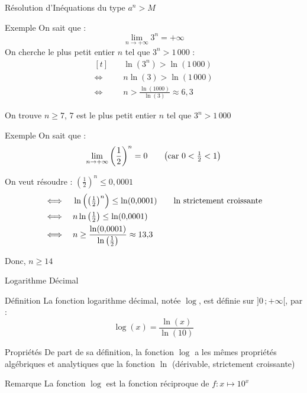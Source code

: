 \documentclass{cours}
\begin{document}
    \begin{Gpartie}{Résolution d'Inéquations du type $a^n>M$}
        \begin{Spartie}{Exemple}
            On sait que : \[\lim_{n\to+\infty}3^n=+\infty\]
            On cherche le plus petit entier $n$ tel que $3^n>1\,000$ :
            \[\begin{aligned}[t]
                &\quad\ln(3^n)>\ln(1\,000) \\
                \iff&\quad n\ln(3)>\ln(1\,000) \\
                \iff&\quad n>\frac{\ln(1000)}{\ln(3)}\approx 6{,}3
            \end{aligned}\]

            On trouve $n\geq 7$, $7$ est le plus petit entier $n$ tel que $3^n>1\,000$
        \end{Spartie}
        \begin{Spartie}{Exemple}
            On sait que : \[\lim_{n\to+\infty}\left(\frac{1}{2}\right)^n=0\text{\qquad \big(car $0<\tfrac{1}{2}<1$\big)}\]
            
            On veut résoudre : $\left(\frac{1}{2}\right)^n\leq 0{,}0001$
            \[\begin{aligned}[t]
                \iff&\quad\ln\Big(\big(\tfrac{1}{2}\big)^n\Big)\leq\ln(0{,}0001)\text{\qquad $\ln$ strictement croissante} \\
                \iff&\quad n\ln\big(\tfrac{1}{2}\big)\leq\ln(0{,}0001) \\
                \iff&\quad n\geq\frac{\ln(0{,}0001)}{\ln\left(\frac{1}{2}\right)}\approx13{,}3
            \end{aligned}\]

            Donc, $n\geq 14$
        \end{Spartie}
    \end{Gpartie}
    \begin{Gpartie}{Logarithme Décimal} 
        \begin{Spartie}{Définition} 
            La fonction logarithme décimal, notée $\log$, est définie sur $\big]0\,;+\infty\big[$, par :
            \[\log(x)=\frac{\ln(x)}{\ln(10)}\]

        \end{Spartie}
        \begin{Spartie}{Propriétés} 
            De part de sa définition, la fonction $\log$ a les mêmes propriétés algébriques et analytiques que la fonction $\ln$ (dérivable, strictement croissante) 
        \end{Spartie}
        \begin{Spartie}{Remarque} 
            La fonction $\log$ est la fonction réciproque de $f:x\mapsto 10^x$
        \end{Spartie}
    \end{Gpartie}
\end{document}
